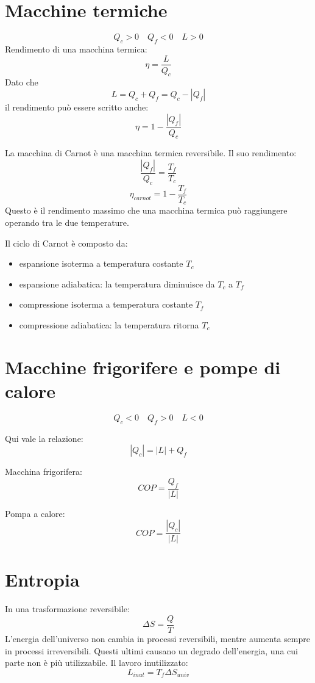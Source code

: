 \documentclass{article}
\begin{document}
\section*{Macchine termiche}
$$ Q_c > 0 \hspace{1em} Q_f < 0 \hspace{1em} L > 0 $$
Rendimento di una macchina termica:
$$ \eta = \frac{L}{Q_c} $$
Dato che
$$ L = Q_c + Q_f = Q_c - |Q_f| $$
il rendimento può essere scritto anche:
$$ \eta = 1 - \frac{|Q_f|}{Q_c} $$

\vspace{1em}

La macchina di Carnot è una macchina termica reversibile. Il suo rendimento:
$$ \frac{|Q_f|}{Q_c} = \frac{T_f}{T_c} $$
$$ \eta_{carnot} = 1 - \frac{T_f}{T_c} $$
Questo è il rendimento massimo che una macchina termica può raggiungere operando tra le due temperature.

\vspace{1em}

Il ciclo di Carnot è composto da:
\begin{itemize}
    \item espansione isoterma a temperatura costante $T_c$
    \item espansione adiabatica: la temperatura diminuisce da $T_c$ a $T_f$
    \item compressione isoterma a temperatura costante $T_f$
    \item compressione adiabatica: la temperatura ritorna $T_c$
\end{itemize}

\section*{Macchine frigorifere e pompe di calore}
$$ Q_c < 0 \hspace{1em} Q_f > 0 \hspace{1em} L < 0 $$

Qui vale la relazione:
$$ |Q_c| = |L| + Q_f $$

Macchina frigorifera:
$$ COP = \frac{Q_f}{|L|} $$

Pompa a calore:
$$ COP = \frac{|Q_c|}{|L|} $$

\section*{Entropia}
In una trasformazione reversibile:
$$ \Delta S = \frac{Q}{T} $$
L'energia dell'universo non cambia in processi reversibili, mentre aumenta sempre in processi irreversibili. Questi ultimi causano un degrado dell'energia, una cui parte non è più utilizzabile. Il lavoro inutilizzato:
$$ L_{inut} = T_f \Delta S_{univ} $$
\end{document}
